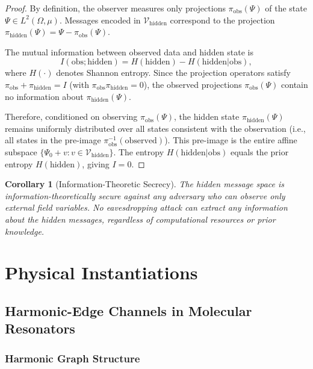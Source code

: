 \documentclass[11pt,twocolumn,a4paper]{article}
\newtheorem{corollary}[theorem]{Corollary}
\theoremstyle{definition}
\begin{document}
\begin{proof}
By definition, the observer measures only projections $\pi_{\text{obs}}(\Psi)$ of the state $\Psi \in L^2(\Omega,\mu)$. Messages encoded in $\mathcal{V}_{\text{hidden}}$ correspond to the projection $\pi_{\text{hidden}}(\Psi) = \Psi - \pi_{\text{obs}}(\Psi)$.

The mutual information between observed data and hidden state is
\[
I(\text{obs}; \text{hidden}) = H(\text{hidden}) - H(\text{hidden}|\text{obs}),
\]
where $H(\cdot)$ denotes Shannon entropy. Since the projection operators satisfy $\pi_{\text{obs}} + \pi_{\text{hidden}} = I$ (with $\pi_{\text{obs}} \pi_{\text{hidden}} = 0$), the observed projections $\pi_{\text{obs}}(\Psi)$ contain no information about $\pi_{\text{hidden}}(\Psi)$.

Therefore, conditioned on observing $\pi_{\text{obs}}(\Psi)$, the hidden state $\pi_{\text{hidden}}(\Psi)$ remains uniformly distributed over all states consistent with the observation (i.e., all states in the pre-image $\pi_{\text{obs}}^{-1}(\text{observed})$). This pre-image is the entire affine subspace $\{\Psi_0 + v : v \in \mathcal{V}_{\text{hidden}}\}$. The entropy $H(\text{hidden}|\text{obs})$ equals the prior entropy $H(\text{hidden})$, giving $I = 0$.
\end{proof}

\begin{corollary}[Information-Theoretic Secrecy]
\label{cor:secrecy}
The hidden message space is information-theoretically secure against any adversary who can observe only external field variables. No eavesdropping attack can extract any information about the hidden messages, regardless of computational resources or prior knowledge.
\end{corollary}

\section{Physical Instantiations}
\label{sec:instantiations}

\subsection{Harmonic-Edge Channels in Molecular Resonators}

\subsubsection{Harmonic Graph Structure}
\end{document}
